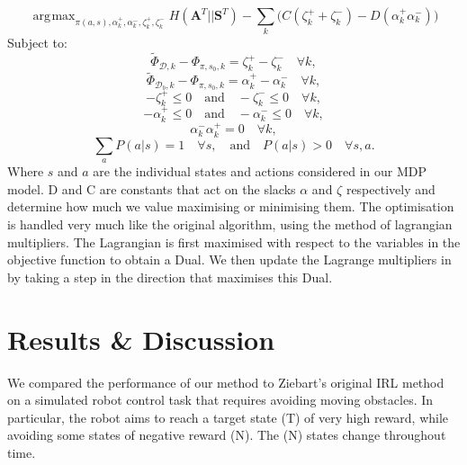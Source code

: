 \documentclass[conference]{IEEEtran}
\DeclareMathOperator*{\argmax}{\arg\!\max}
\begin{document}
	\begin{equation*}
	\argmax_{\pi(a,s),\alpha^+_k ,\alpha^-_k ,\zeta^+_k, \zeta^-_k} H(\mathbf{A}^T||\mathbf{S}^T) - \sum_k\big(C(\zeta^+_k + \zeta^-_k)  -D(\alpha^+_k  \alpha^-_k)\big)
\end{equation*}
Subject to:
\begin{equation*}
  \widetilde{\Phi}_{\mathcal{D},k}-\Phi_{\pi,s_0,k}   = \zeta^+_k  - \zeta^-_k \quad \forall k, \label{eq:good_ineq}
\end{equation*}
\begin{equation*}
	\widetilde{\Phi}_{\mathcal{D}_b,k}-\Phi_{\pi,s_0,k}  = \alpha^+_k-\alpha^-_k \quad \forall k, \label{eq:bad_ineq}
\end{equation*}
\begin{equation*}
	-\zeta^+_k \leq 0 \quad \text{and} \quad -\zeta^-_k \leq 0 \quad \forall k,
\end{equation*}
\begin{equation*}
	-\alpha^+_k \leq 0 \quad \text{and} \quad -\alpha^-_k \leq 0 \quad \forall k,
\end{equation*}
\begin{equation*}
	\alpha^-_k \alpha^+_k = 0 \quad \forall k,  \label{eq:quadratic}
\end{equation*}
\begin{equation*}
\sum_aP(a|s)  = 1 \quad \forall s,   \quad \text{and} \quad P(a|s)  > 0 \quad \forall s,a.  
\end{equation*}
Where $s$ and $a$ are the individual states and actions considered in our MDP model. D and C are constants that act on the slacks $\alpha$ and $\zeta$ respectively and determine how much we value maximising or minimising them. The optimisation is handled very much like the original algorithm, using the method of lagrangian multipliers. The Lagrangian is first maximised with respect to the variables in the objective function to obtain a Dual. We then update the Lagrange multipliers in by taking a step in the direction that maximises this Dual.

\section{Results \& Discussion}

We compared the performance of our method to Ziebart's original IRL method on a simulated robot control task that requires avoiding moving obstacles.  In particular, the robot aims to reach a target state (T) of very high reward,
while avoiding some states of negative reward (N). The (N) states change throughout time.
 
\end{document}
